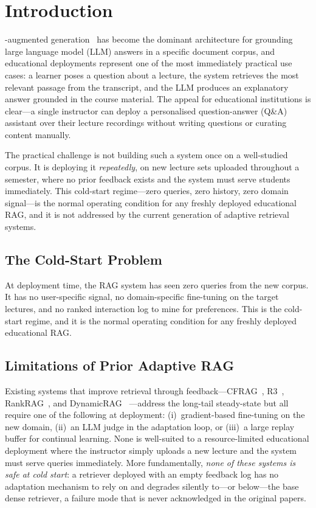 \documentclass[journal]{IEEEtran}
\begin{document}
\section{Introduction}
\label{sec:intro}
-augmented generation~\cite{lewis2020rag} has
become the dominant architecture for grounding large language model (LLM)
answers in a specific document corpus, and educational deployments
represent one of the most immediately practical use cases: a learner poses
a question about a lecture, the system retrieves the most relevant passage
from the transcript, and the LLM produces an explanatory answer grounded
in the course material.  The appeal for educational institutions is
clear---a single instructor can deploy a personalised question-answer (Q\&A)
assistant over their lecture recordings without writing questions or
curating content manually.

The practical challenge is not building such a system once on a well-studied
corpus.  It is deploying it \emph{repeatedly}, on new lecture sets uploaded
throughout a semester, where no prior feedback exists and the system must
serve students immediately.  This cold-start regime---zero queries, zero
history, zero domain signal---is the normal operating condition for any
freshly deployed educational RAG, and it is not addressed by the current
generation of adaptive retrieval systems.

\subsection{The Cold-Start Problem}
At deployment time, the RAG system has seen zero queries from the new corpus.
It has no user-specific signal, no domain-specific fine-tuning on the target
lectures, and no ranked interaction log to mine for preferences.  This is the
cold-start regime, and it is the normal operating condition for any freshly
deployed educational RAG.

\subsection{Limitations of Prior Adaptive RAG}
Existing systems that improve retrieval through feedback---CFRAG~\cite{cfrag2025},
R3~\cite{r32025}, RankRAG~\cite{rankrag2024}, and DynamicRAG~\cite{dynamicrag2024}%
---address the long-tail steady-state but all require one of the following at
deployment: (i)~gradient-based fine-tuning on the new domain, (ii)~an LLM
judge in the adaptation loop, or (iii)~a large replay buffer for continual
learning.  None is well-suited to a resource-limited educational deployment
where the instructor simply uploads a new lecture and the system must serve
queries immediately.  More fundamentally, \emph{none of these systems is safe
at cold start}: a retriever deployed with an empty feedback log has no
adaptation mechanism to rely on and degrades silently to---or below---the
base dense retriever, a failure mode that is never acknowledged in the
original papers.
\end{document}

